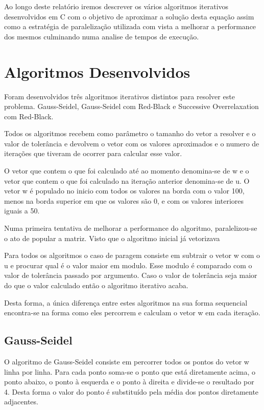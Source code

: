 \documentclass[a4paper]{report}
\begin{document}
Ao longo deste relatório iremos descrever os vários algoritmos iterativos
desenvolvidos em C com o objetivo de aproximar a solução desta equação assim
como a estratégia de paralelização utilizada com vista a melhorar a performance
dos mesmos culminando numa analise de tempos de execução.

\chapter{Algoritmos Desenvolvidos}

Foram desenvolvidos três algoritmos iterativos distintos para resolver este
problema. Gauss-Seidel, Gauss-Seidel com Red-Black e Successive Overrelaxation
com Red-Black.

Todos os algoritmos recebem como parâmetro o tamanho do vetor a resolver e o
valor de tolerância e devolvem o vetor com os valores aproximados e o numero de
iterações que tiveram de ocorrer para calcular esse valor.

O vetor que contem o que foi calculado até ao momento denomina-se de w e o vetor
que contem o que foi calculado na iteração anterior denomina-se de u. O vetor w
é populado no inicio com todos os valores na borda com o valor 100, menos na
borda superior em que os valores são 0, e com os valores interiores iguais a 50.

Numa primeira tentativa de melhorar a performance do algoritmo, paralelizou-se o
ato de popular a matriz. Visto que o algoritmo inicial já vetorizava

Para todos os algoritmos o caso de paragem consiste em subtrair o vetor w com o
u e procurar qual é o valor maior em modulo. Esse modulo é comparado com o valor
de tolerância passado por argumento. Caso o valor de tolerância seja maior do
que o valor calculado então o algoritmo iterativo  acaba.

Desta forma, a única diferença entre estes algoritmos na sua forma sequencial
encontra-se na forma como eles percorrem e calculam o vetor w em cada iteração.

\section{Gauss-Seidel}

O algoritmo de Gauss-Seidel consiste em percorrer todos os pontos do vetor w
linha por linha. Para cada ponto soma-se o ponto que está diretamente acima, o
ponto abaixo, o ponto à esquerda e o ponto à direita e divide-se o resultado por
4. Desta forma o valor do ponto é substituído pela média dos pontos diretamente
adjacentes.
\end{document}
